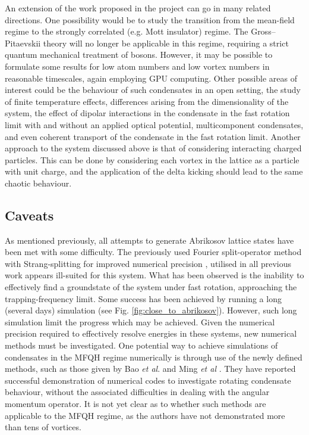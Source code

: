 An extension of the work proposed in the project can go in many related directions. One possibility would be to study the transition from the mean-field regime to the strongly correlated (e.g. Mott insulator) regime. The Gross--Pitaevskii theory will no
longer be applicable in this regime, requiring a strict quantum mechanical treatment of bosons. However, it may be possible to formulate some
results for low atom numbers and low vortex numbers in reasonable timescales, again employing GPU computing.  Other possible areas of interest could be the behaviour of such condensates in an open setting, the study of finite temperature effects, differences arising from the dimensionality of the system, the effect of dipolar interactions in the condensate in the fast rotation limit with and without an applied optical potential, multicomponent condensates, and even coherent transport of the condensate in the fast rotation limit.
Another approach to the system discussed above is that of considering interacting charged particles. This can be done by considering each vortex in the lattice as a particle with unit charge, and the application of the delta kicking should lead to the same chaotic behaviour.

\subsection{Caveats}
As mentioned previously, all attempts to generate Abrikosov lattice states have been met with some difficulty. The previously
 used Fourier split-operator method \cite{Num:Bauke_cpc_2011} with Strang-splitting for improved numerical precision \cite{Num:Sanchez_parcomp_2008}, utilised in all previous work appears ill-suited for this system. What has been observed is the inability to effectively find a groundstate of the system
 under fast rotation, approaching the trapping-frequency limit. Some success has been achieved by running a long (several days) simulation (see Fig. \ref{fig:close_to_abrikosov}). However, such long simulation limit the progress which may be achieved. Given the numerical precision required to effectively resolve energies in these systems, new numerical methods must be investigated. One potential way to achieve simulations of condensates in the MFQH regime numerically is through use of the newly defined methods, such as those given by Bao \textit{et al}. and Ming \textit{et al} \cite{Num:Bao_siam_2013,Num:Ming_jcp_2014}. They have reported successful demonstration of numerical codes to investigate rotating condensate behaviour, without the associated difficulties in dealing with the angular momentum operator. It is not yet clear as to whether such methods are applicable to the MFQH regime, as the authors have not demonstrated more than tens of vortices.
